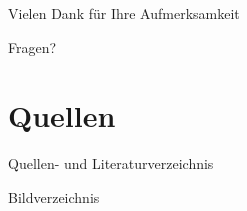\begin{frame}{Vielen Dank für Ihre Aufmerksamkeit}
    \begin{center}
        Fragen?
    \end{center}
\end{frame}

\section{Quellen}

\begin{frame}[allowframebreaks]{Quellen- und Literaturverzeichnis}
    \printbibliography[heading=none, notkeyword={image}, notkeyword={online}]   
\end{frame}


\begin{frame}[allowframebreaks]{Bildverzeichnis}
    \printbibliography[heading=none, keyword={image}]
\end{frame}